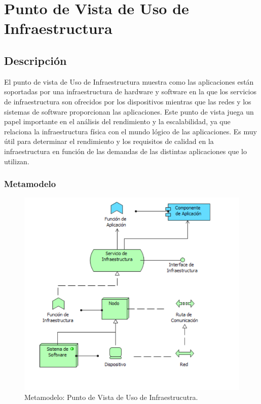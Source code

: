\section{Punto de Vista de Uso de Infraestructura}
\subsection{Descripción}
El punto de vista de Uso de Infraestructura muestra como las aplicaciones están soportadas por una infraestructura de hardware y software en la que los servicios de infraestructura  son ofrecidos por los dispositivos mientras que las  redes y los sistemas de software proporcionan las aplicaciones. Este punto de vista juega un papel importante en el análisis del rendimiento y la escalabilidad, ya que relaciona la infraestructura física con el mundo lógico de las aplicaciones. Es muy útil para determinar el rendimiento y los requisitos de calidad en la infraestructura en función de las demandas de las distintas aplicaciones que lo utilizan.

\subsubsection{Metamodelo}
\begin{figure}[H]
	\centering
	\includegraphics[width=1.0\textwidth]{imagenes/Metamodelos/Tecnologia/meta_uso_infraestructura.PDF}
	\caption{Metamodelo: Punto de Vista de Uso de Infraestrucutra.}
	\label{fig:gap_analysis}
\end{figure}


